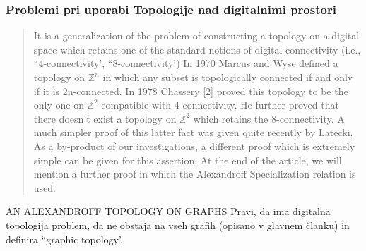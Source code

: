 \documentclass[a4paper, 12pt]{book}
\begin{document}
\subsubsection{Problemi pri uporabi Topologije nad digitalnimi prostori}
\begin{quote}
  It is a generalization of the problem of constructing a topology on a
  digital space which retains one of the standard notions of
  digital connectivity (i.e., ``4-connectivity', ``8-connectivity')
  In 1970 Marcus and Wyse deﬁned a topology on
  $\mathbb{Z}^n$ in which any subset is topologically connected if and
  only if it is 2n-connected. In 1978 Chassery [2] proved this
  topology to be the only one on $\mathbb{Z}^2$ compatible with 4-connectivity.
  He further proved that there doesn't exist a
  topology on $\mathbb{Z}^2$ which retains the 8-connectivity. A much
  simpler proof of this latter fact was given quite recently
  by Latecki. As a by-product of our investigations, a
  different proof which is extremely simple can be given for
  this assertion. At the end of the article, we will mention
  a further proof in which the Alexandroff Specialization
  relation is used.
\end{quote}





\href{http://bims.iranjournals.ir/article_266_e1ff26c6f7b350afcde8bd3ec3654132.pdf}{AN ALEXANDROFF TOPOLOGY ON GRAPHS}
Pravi, da ima digitalna\\ topologija problem, da ne obstaja na vseh grafih
(opisano v glavnem članku) in definira ``graphic topology'.
\end{document}
